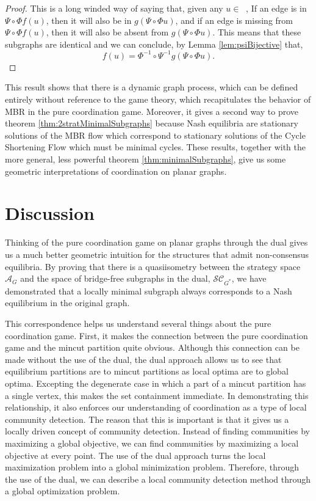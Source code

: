 \documentclass{article}
\DeclareMathOperator{\At}{\mathcal{A}_{G}^{(2)}}
\begin{document}
\begin{proof}
    This is a long winded way of saying that, given any $u\in \At$, If an edge is in $\Psi\circ\Phi f(u)$, then it will also be in $g(\Psi \circ\Phi u)$, and if an edge is missing from $\Psi \circ\Phi f(u)$, then it will also be absent from $g(\Psi\circ\Phi u)$. This means that these subgraphs are identical and we can conclude, by Lemma \ref{lem:psiBijective} that,
    \[f(u)=\Phi^{-1}\circ\Psi^{-1}g(\Psi\circ\Phi u).\]
\end{proof}

This result shows that there is a dynamic graph process, which can be defined entirely without reference to the game theory, which recapitulates the behavior of MBR in the pure coordination game. Moreover, it gives a second way to prove theorem \ref{thm:2stratMinimalSubgraphs} because Nash equilibria are stationary solutions of the MBR flow which correspond to stationary solutions of the Cycle Shortening Flow which must be minimal cycles. These results, together with the more general, less powerful theorem \ref{thm:minimalSubgraphs}, give us some geometric interpretations of coordination on planar graphs. 
    

    
\section{Discussion}\label{sec:discussion}

Thinking of the pure coordination game on planar graphs through the dual gives us a much better geometric intuition for the structures that admit non-consensus equilibria. By proving that there is a quasiisometry between the strategy space $\mathcal{A}_G$ and the space of bridge-free subgraphs in the dual, $\mathcal{SC}_{G^*}$,  we have demonstrated that a locally minimal subgraph always corresponds to a Nash equilibrium in the original graph. 

This correspondence helps us understand several things about the pure coordination game. First, it makes the connection between the pure coordination game and the mincut partition quite obvious. Although this connection can be made without the use of the dual, the dual approach allows us to see that equilibrium partitions are to mincut partitions as local optima are to global optima. Excepting the degenerate case in which a part of a mincut partition has a single vertex, this makes the set containment immediate. In demonstrating this relationship, it also enforces our understanding of coordination as a type of local community detection. 
The reason that this is important is that it gives us a locally driven concept of community detection. Instead of finding communities by maximizing a global objective, we can find communities by maximizing a local objective at every point. The use of the dual approach turns the local maximization problem into a global minimization problem. Therefore, through the use of the dual, we can describe a local community detection method through a global optimization problem. 
\end{document}
